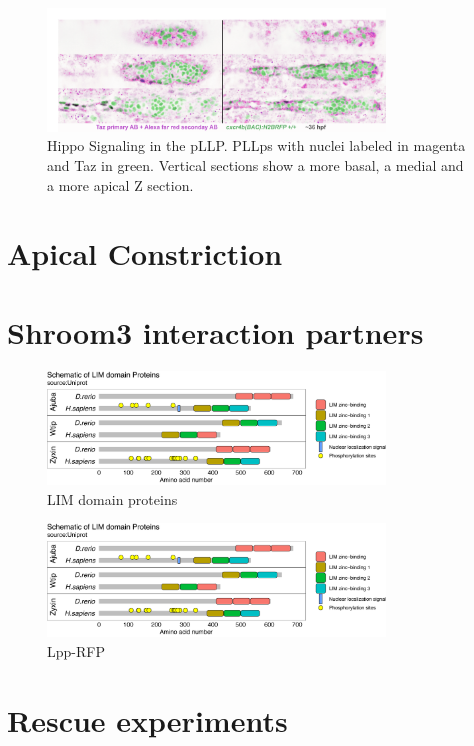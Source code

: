 \documentclass[11pt,singlespacinge,twoside]{reedthesis} %
\begin{document}
\begin{figure}

{\centering \includegraphics[width=0.8\textwidth]{figures/supp/immunos} 

}

\caption[Hippo Signaling in the pLLP]{Hippo Signaling in the pLLP. PLLps with nuclei labeled in magenta and Taz in green. Vertical sections show a more basal, a medial and a more apical Z section.}\label{fig:suppyap}
\end{figure}
\hypertarget{apical-constriction-3}{%
\section{Apical Constriction}\label{apical-constriction-3}}

\hypertarget{shroom3-interaction-partners}{%
\section{Shroom3 interaction partners}\label{shroom3-interaction-partners}}


\begin{figure}

{\centering \includegraphics[width=0.8\textwidth]{figures/supp/lim} 

}

\caption[LIM domain proteins]{LIM domain proteins}\label{fig:supplim}
\end{figure}

\begin{figure}

{\centering \includegraphics[width=0.8\textwidth]{figures/supp/lim} 

}

\caption[Lpp-RFP]{Lpp-RFP}\label{fig:supplpp}
\end{figure}
\hypertarget{rescue-experiments-1}{%
\section{Rescue experiments}\label{rescue-experiments-1}}
\end{document}
